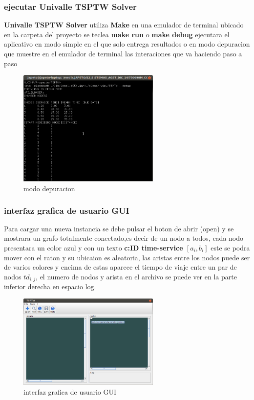 \documentclass[journal, a4paper]{IEEEtran}
\begin{document}
\subsubsection{ejecutar Univalle TSPTW Solver}
\textbf{Univalle TSPTW Solver} utiliza \textbf{Make} en una emulador de terminal
ubicado en la carpeta del proyecto se teclea \textbf{make run} o \textbf{make debug}
ejecutara el aplicativo en modo simple en el que solo entrega resultados
o en modo depuracion que muestre en el emulador de terminal
las interaciones que va haciendo paso a paso
\begin{figure}[H]
\centering
\includegraphics[width=70mm]{debug.png}
  \caption{modo depuracion}
  \label{usando el comando make debug}
\end{figure}
\subsubsection{interfaz grafica de usuario GUI}
Para cargar una nueva instancia se debe pulsar el boton de abrir (open)
y se mostrara un grafo totalmente conectado,es decir de un nodo a todos,
cada nodo presentara un color azul y con un texto \textbf{ c:ID time-service \([a_{i},b_{i}]\) }
este se podra mover con el raton y su ubicaion es aleatoria,
las aristas entre los nodos puede ser de varios colores y encima de estas aparece el tiempo de viaje 
entre un par de nodos \(td_{i,j} \), el numero de nodos y arista en el archivo se puede ver
en la parte inferior derecha en espacio log.
\begin{figure}[H]
\centering
\includegraphics[width=70mm]{front.png}
  \caption{interfaz grafica de usuario GUI}
  \label{usando el comando make run}
\end{figure}
\end{document}
